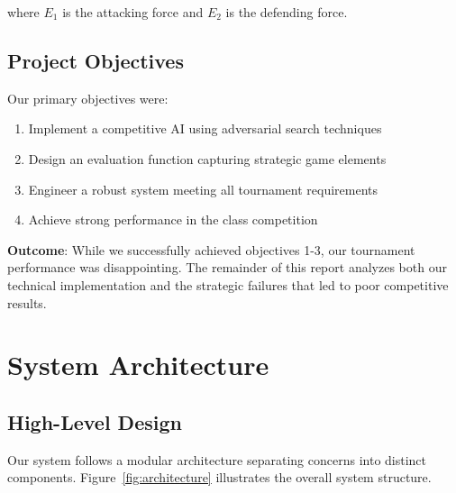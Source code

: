 \documentclass[11pt,a4paper]{article}
\begin{document}
where $E_1$ is the attacking force and $E_2$ is the defending force.

\subsection{Project Objectives}

Our primary objectives were:
\begin{enumerate}
    \item Implement a competitive AI using adversarial search techniques
    \item Design an evaluation function capturing strategic game elements
    \item Engineer a robust system meeting all tournament requirements
    \item Achieve strong performance in the class competition
\end{enumerate}

\textbf{Outcome}: While we successfully achieved objectives 1-3, our tournament performance was disappointing. The remainder of this report analyzes both our technical implementation and the strategic failures that led to poor competitive results.

\section{System Architecture}

\subsection{High-Level Design}

Our system follows a modular architecture separating concerns into distinct components. Figure~\ref{fig:architecture} illustrates the overall system structure.
\end{document}
